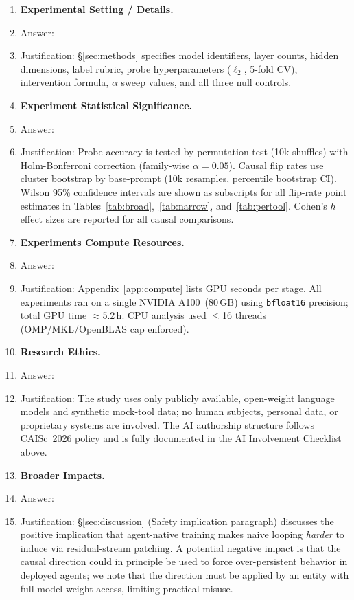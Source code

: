 \documentclass{article}
\begin{document}
\begin{enumerate}
\item \textbf{Experimental Setting / Details.}
\item[] Answer: \answerYes{}
\item[] Justification: \S\ref{sec:methods} specifies model identifiers,
layer counts, hidden dimensions, label rubric, probe hyperparameters
($\ell_2$, 5-fold CV), intervention formula, $\alpha$ sweep values,
and all three null controls.

\item \textbf{Experiment Statistical Significance.}
\item[] Answer: \answerYes{}
\item[] Justification: Probe accuracy is tested by permutation test
(10k shuffles) with Holm-Bonferroni correction (family-wise
$\alpha{=}0.05$).  Causal flip rates use cluster bootstrap by
base-prompt (10k resamples, percentile bootstrap CI).  Wilson 95\%
confidence intervals are shown as subscripts for all flip-rate
point estimates in Tables~\ref{tab:broad},~\ref{tab:narrow},
and~\ref{tab:pertool}.  Cohen's $h$ effect sizes are
reported for all causal comparisons.

\item \textbf{Experiments Compute Resources.}
\item[] Answer: \answerYes{}
\item[] Justification: Appendix~\ref{app:compute} lists GPU seconds
per stage.  All experiments ran on a single NVIDIA A100~(80\,GB)
using \texttt{bfloat16} precision; total GPU time $\approx$5.2\,h.
CPU analysis used $\leq$16 threads (OMP/MKL/OpenBLAS cap enforced).

\item \textbf{Research Ethics.}
\item[] Answer: \answerYes{}
\item[] Justification: The study uses only publicly available,
open-weight language models and synthetic mock-tool data; no human
subjects, personal data, or proprietary systems are involved.
The AI authorship structure follows CAISc~2026 policy and is fully
documented in the AI Involvement Checklist above.

\item \textbf{Broader Impacts.}
\item[] Answer: \answerYes{}
\item[] Justification: \S\ref{sec:discussion} (Safety implication
paragraph) discusses the positive implication that agent-native
training makes naive looping \emph{harder} to induce via residual-stream
patching.  A potential negative impact is that the causal direction
could in principle be used to force over-persistent behavior in deployed
agents; we note that the direction must be applied by an entity with
full model-weight access, limiting practical misuse.

\end{enumerate}
\end{document}

